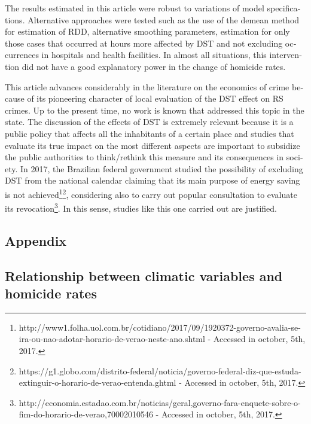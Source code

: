 \documentclass[12pt,openright,oneside,a4paper,english,french,spanish]{abntex2}
\numberwithin{table}{section} %
\numberwithin{figure}{section} %
\begin{document}
\begin{otherlanguage}{english}
The results estimated in this article were robust to variations of model specifications. Alternative approaches were tested such as the use of the demean method for estimation of RDD, alternative smoothing parameters, estimation for only those cases that occurred at hours more affected by DST and not excluding occurrences in hospitals and health facilities. In almost all situations, this intervention did not have a good explanatory power in the change of homicide rates.

This article advances considerably in the literature on the economics of crime because of its pioneering character of local evaluation of the DST effect on RS crimes. Up to the present time, no work is known that addressed this topic in the state. The discussion of the effects of DST is extremely relevant because it is a public policy that affects all the inhabitants of a certain place and studies that evaluate its true impact on the most different aspects are important to subsidize the public authorities to think/rethink this measure and its consequences in society. In 2017, the Brazilian federal government studied the possibility of excluding DST from the national calendar claiming that its main purpose of energy saving is not achieved\footnote{http://www1.folha.uol.com.br/cotidiano/2017/09/1920372-governo-avalia-se-ira-ou-nao-adotar-horario-de-verao-neste-ano.shtml - Accessed in october, 5th, 2017.}\footnote{https://g1.globo.com/distrito-federal/noticia/governo-federal-diz-que-estuda-extinguir-o-horario-de-verao-entenda.ghtml - Accessed in october, 5th, 2017.}, considering also to carry out popular consultation to evaluate its revocation\footnote{http://economia.estadao.com.br/noticias/geral,governo-fara-enquete-sobre-o-fim-do-horario-de-verao,70002010546 - Accessed in october, 5th, 2017.}. In this sense, studies like this one carried out are justified.



\begin{subappendices}
\chapter*{Appendix}
\section{Relationship between climatic variables and homicide rates\label{appen:HV_clima_e_taxa}}


\end{subappendices}
\end{otherlanguage}
\end{document}

